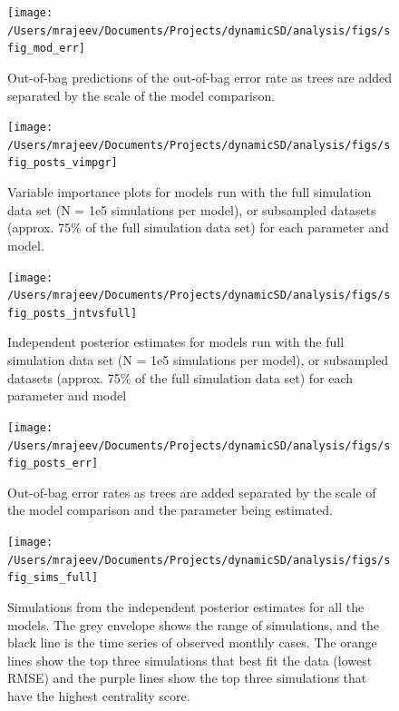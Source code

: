 \documentclass[
  oneside]{book}
\begin{document}
\begin{figure}
\texttt{[image: /Users/mrajeev/Documents/Projects/dynamicSD/analysis/figs/sfig\_mod\_err]} \caption{Out-of-bag predictions of the out-of-bag error rate as trees are added separated by the scale of the model comparison.}\label{fig:sfig-mod-err}
\end{figure}



\begin{figure}
\texttt{[image: /Users/mrajeev/Documents/Projects/dynamicSD/analysis/figs/sfig\_posts\_vimpgr]} \caption[Variable importance plots for parameters with full or subsampled simulations.]{Variable importance plots for models run with the full simulation data set (N = 1e5 simulations per model), or subsampled datasets (approx. 75\% of the full simulation data set) for each parameter and model.}\label{fig:sfig-posts-vimp}
\end{figure}



\begin{figure}
\texttt{[image: /Users/mrajeev/Documents/Projects/dynamicSD/analysis/figs/sfig\_posts\_jntvsfull]} \caption[Independent posterior estimates for models run with the full simulation data set]{Independent posterior estimates for models run with the full simulation data set (N = 1e5 simulations per model), or subsampled datasets (approx. 75\% of the full simulation data set) for each parameter and model}\label{fig:sfig-posts-jntvsfull}
\end{figure}



\begin{figure}
\texttt{[image: /Users/mrajeev/Documents/Projects/dynamicSD/analysis/figs/sfig\_posts\_err]} \caption{Out-of-bag error rates as trees are added separated by the scale of the model comparison and the parameter being estimated.}\label{fig:sfig-posts-err}
\end{figure}



\begin{figure}
\texttt{[image: /Users/mrajeev/Documents/Projects/dynamicSD/analysis/figs/sfig\_sims\_full]} \caption[Simulations from the independent posterior estimates for all the models.]{Simulations from the independent posterior estimates for all the models. The grey envelope shows the range of simulations, and the black line is the time series of observed monthly cases. The orange lines show the top three simulations that best fit the data (lowest RMSE) and the purple lines show the top three simulations that have the highest centrality score.}\label{fig:sfig-sims-full}
\end{figure}
\end{document}
